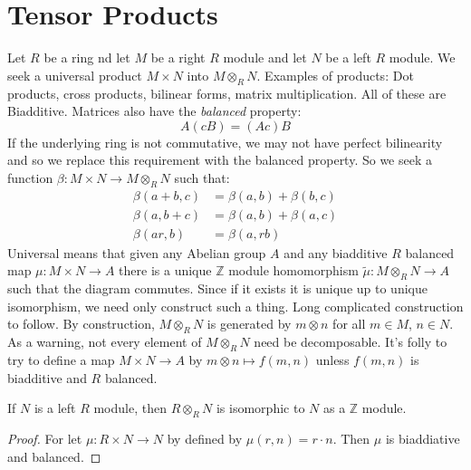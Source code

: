 \documentclass[crop=false,class=article]{standalone}                           %
\begin{document}
    \section{Tensor Products}
        Let $R$ be a ring nd let $M$ be a right $R$ module and let $N$ be a
        left $R$ module. We seek a universal product $M\times{N}$ into
        $M\otimes_{R}N$. Examples of products: Dot products, cross products,
        bilinear forms, matrix multiplication. All of these are Biadditive.
        Matrices also have the \textit{balanced} property:
        \begin{equation}
            A(cB)=(Ac)B
        \end{equation}
        If the underlying ring is not commutative, we may not have perfect
        bilinearity and so we replace this requirement with the balanced
        property. So we seek a function
        $\beta:M\times{N}\rightarrow{M}\otimes_{R}N$ such that:
        \begin{align}
            \beta(a+b,c)&=\beta(a,b)+\beta(b,c)\tag{Left Additivity}\\
            \beta(a,b+c)&=\beta(a,b)+\beta(a,c)\tag{Right Additivity}\\
            \beta(ar,b)&=\beta(a,rb)\tag{Balanced}
        \end{align}
        Universal means that given any Abelian group $A$ and any biadditive
        $R$ balanced map $\mu:M\times{N}\rightarrow{A}$ there is a unique
        $\mathbb{Z}$ module homomorphism
        $\tilde{\mu}:M\otimes_{R}N\rightarrow{A}$ such that the diagram
        commutes. Since if it exists it is unique up to unique isomorphism, we
        need only construct such a thing. Long complicated construction to
        follow. By construction, $M\otimes_{R}N$ is generated by $m\otimes{n}$
        for all $m\in{M}$, $n\in{N}$. As a warning, not every element of
        $M\otimes_{R}N$ need be decomposable. It's folly to try to define a map
        $M\times{N}\rightarrow{A}$ by $m\otimes{n}\mapsto{f}(m,n)$ unless
        $f(m,n)$ is biadditive and $R$ balanced.
        \begin{theorem}
            If $N$ is a left $R$ module, then $R\otimes_{R}N$ is isomorphic to
            $N$ as a $\mathbb{Z}$ module.
        \end{theorem}
        \begin{proof}
            For let $\mu:R\times{N}\rightarrow{N}$ by defined by
            $\mu(r,n)=r\cdot{n}$. Then $\mu$ is biaddiative and balanced.
        \end{proof}
\end{document}
